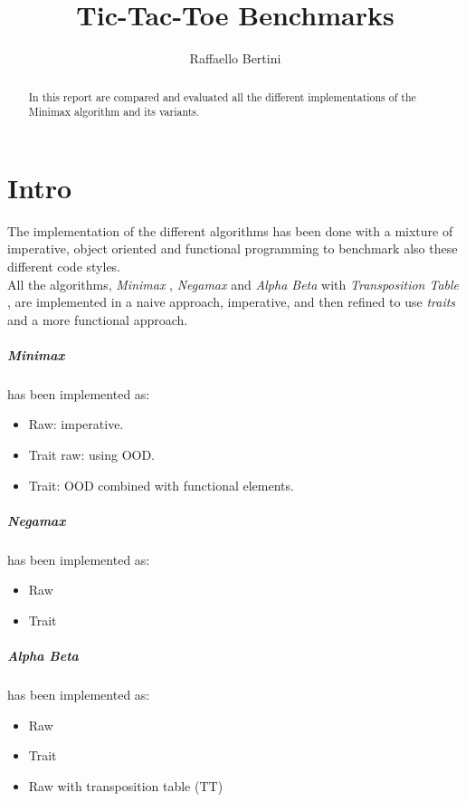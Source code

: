 \documentclass[]{report}
\title{Tic-Tac-Toe Benchmarks}
\author{Raffaello Bertini}
\begin{document}
\maketitle

\begin{abstract}
	In this report are compared and evaluated all the different implementations of the Minimax algorithm and its variants.
\end{abstract}

\chapter{Intro}

The implementation of the different algorithms \autocite{MIT} has been done with a mixture of imperative, object oriented and functional programming to benchmark also these different code styles.\\

All the algorithms, \textit{Minimax} \autocite{wiki-minimax}, \textit{Negamax} \autocite{wiki-negamax} and \textit{Alpha Beta} \autocite{wiki-alphabeta} with \textit{Transposition Table} \autocite{wiki-transtable}, are implemented in a naive approach, imperative, and then refined to use \textit{traits} and a more functional approach.\\

\paragraph{Minimax}
has been implemented as:
\begin{itemize}
	\item Raw: imperative.
	\item Trait raw: using  OOD.
	\item Trait: OOD combined with functional elements. 
\end{itemize}

\paragraph{Negamax} has been implemented as:
\begin{itemize}
	\item Raw
	\item Trait
\end{itemize}

\paragraph{Alpha Beta} has been implemented as:
\begin{itemize}
	\item Raw
	\item Trait
	\item Raw with transposition table (TT)
\end{itemize}
\end{document}
